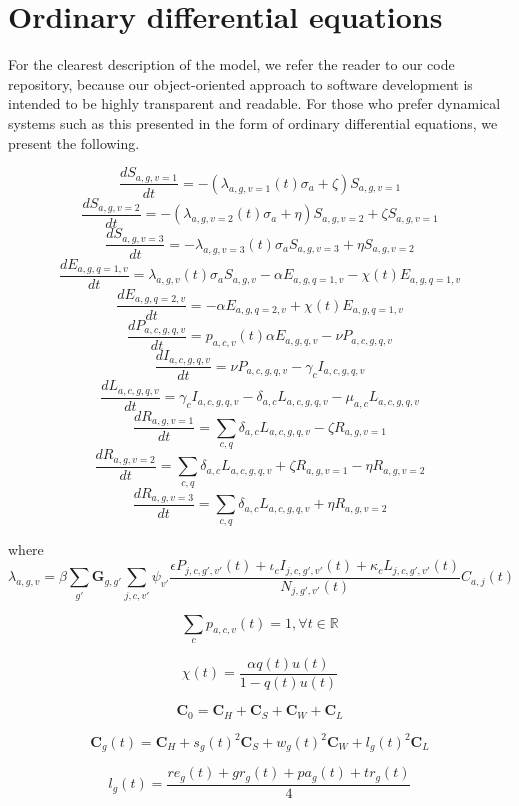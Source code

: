 
\section{Ordinary differential equations}

For the clearest description of the model, we refer the reader to our code repository, because our object-oriented approach to software development is intended to be highly transparent and readable. For those who prefer dynamical systems such as this presented in the form of ordinary differential equations, we present the following.

\[\frac{dS_{a,g,v=1}}{dt}= -(\lambda_{a,g,v=1}(t) \sigma_{a} + \zeta) S_{a,g,v=1} \]
\[\frac{dS_{a,g,v=2}}{dt}= -(\lambda_{a,g,v=2}(t) \sigma_{a} + \eta) S_{a,g,v=2} + \zeta S_{a,g,v=1} \]
\[\frac{dS_{a,g,v=3}}{dt}= -\lambda_{a,g,v=3}(t) \sigma_{a} S_{a,g,v=3} + \eta S_{a,g,v=2} \]
\[\frac{dE_{a,g,q=1,v}}{dt}=\lambda_{a,g,v}(t) \sigma_{a} S_{a,g,v} -\alpha E_{a,g,q=1,v} - \chi(t) E_{a,g,q=1,v} \]
\[\frac{dE_{a,g,q=2,v}}{dt}=-\alpha E_{a,g,q=2,v} + \chi(t) E_{a,g,q=1,v} \]
\[\frac{dP_{a,c,g,q,v}}{dt}=p_{a,c,v}(t) \alpha E_{a,g,q,v}-\nu P_{a,c,g,q,v}\]
\[\frac{dI_{a,c,g,q,v}}{dt}=\nu P_{a,c,g,q,v}-\gamma_{c}I_{a,c,g,q,v}\]
\[\frac{dL_{a,c,g,q,v}}{dt}=\gamma_{c}I_{a,c,g,q,v}-\delta_{a,c}L_{a,c,g,q,v}-\mu_{a,c}L_{a,c,g,q,v}\]
\[\frac{dR_{a,g,v=1}}{dt}=\sum_{c,q}{}\delta_{a,c}L_{a,c,g,q,v} -\zeta R_{a,g,v=1} \]
\[\frac{dR_{a,g,v=2}}{dt}=\sum_{c,q}{}\delta_{a,c}L_{a,c,g,q,v} +\zeta R_{a,g,v=1} - \eta R_{a,g,v=2} \]
\[\frac{dR_{a,g,v=3}}{dt}=\sum_{c,q}{}\delta_{a,c}L_{a,c,g,q,v} +\eta R_{a,g,v=2} \]

where
\[\lambda_{a,g,v}=\beta \sum_{g'}\textbf{G}_{g,g'} \sum_{j,c,v'} \psi_{v'} \frac{\epsilon P_{j,c,g',v'}(t)+\iota_{c}I_{j,c,g',v'}(t)+\kappa_{c}L_{j,c,g',v'}(t)}{N_{j,g',v'}(t)} C_{a,j}(t)\]

\[\sum_{c}p_{a,c,v}(t)=1,\forall t\in\mathbb{R}\]

\[\chi(t) = \frac{\alpha q(t) u(t)}{1 - q(t) u(t)}\]

\[\textbf{C}_{0}=\textbf{C}_{H}+\textbf{C}_{S}+\textbf{C}_{W}+\textbf{C}_{L}\]

\[\textbf{C}_{g}(t)=\textbf{C}_{H}+s_{g}(t)^{2}\textbf{C}_{S}+w_{g}(t)^{2}\textbf{C}_{W}+l_{g}(t)^{2}\textbf{C}_{L}\]

\[l_{g}(t)=\frac{re_{g}(t)+gr_{g}(t)+pa_{g}(t)+tr_{g}(t)}{4}\]

